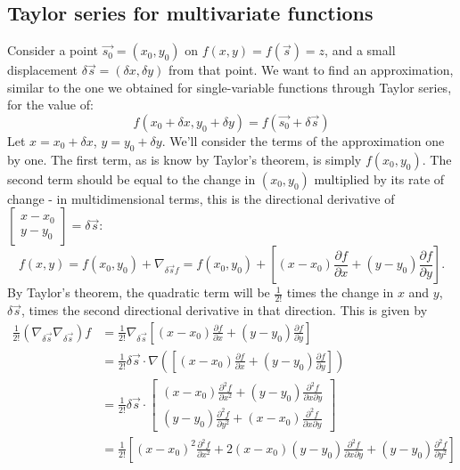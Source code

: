 \documentclass{article}
\begin{document}
\subsection{Taylor series for multivariate functions}
Consider a point $\vec{s_0}=(x_0,y_0)$ on $f(x,y)=f(\vec{s})=z$, and a small displacement $\delta \vec{s}=(\delta x, \delta y)$ from that point. We want to find an approximation, similar to the one we obtained for single-variable functions through Taylor series, for the value of:
\begin{equation*}
    f(x_0+\delta x, y_0+\delta y) = f(\vec{s_0}+\delta \vec{s})
\end{equation*}
Let $x = x_0 + \delta x$, $y=y_0 + \delta y$. We'll consider the terms of the approximation one by one. The first term, as is know by Taylor's theorem, is simply $f(x_0,y_0)$. The second term should be equal to the change in $(x_0,y_0)$ multiplied by its rate of change - in multidimensional terms, this is the directional derivative of $\begin{bmatrix}
    x-x_0\\y-y_0
\end{bmatrix}=\delta \vec{s}$:
\begin{equation*}
    f(x,y)=f(x_0,y_0)+\nabla_{\delta \vec{s} f} =f(x_0,y_0)+[(x-x_0)\frac{\partial f}{\partial x} + (y-y_0)\frac{\partial f}{\partial y}].
\end{equation*}
By Taylor's theorem, the quadratic term will be $\frac{1}{2!}$ times the change in $x$ and $y$, $\delta \vec{s}$, times the second directional derivative in that direction. This is given by 
\begin{equation*}
    \begin{aligned}
        \frac{1}{2!}(\nabla_{\delta \vec{s}}\nabla_{\delta \vec{s}})f &= \frac{1}{2!}\nabla_{\delta \vec{s}}[(x-x_0)\frac{\partial f}{\partial x} + (y-y_0)\frac{\partial f}{\partial y}] \\
        &= \frac{1}{2!}\delta \vec{s}\cdot \nabla([(x-x_0)\frac{\partial f}{\partial x} + (y-y_0)\frac{\partial f}{\partial y}])\\
        &= \frac{1}{2!}\delta \vec{s}\cdot\begin{bmatrix}
            (x-x_0)\frac{\partial^2 f}{\partial x^2} +(y-y_0)\frac{\partial^2 f}{\partial x \partial y}\\
            (y-y_0)\frac{\partial^2 f}{\partial y^2}+(x-x_0)\frac{\partial^2 f}{\partial x \partial y}
        \end{bmatrix} \\
        &= \frac{1}{2!}[(x-x_0)^2 \frac{\partial^2 f}{\partial x^2} + 2(x-x_0)(y-y_0)\frac{\partial^2 f}{\partial x \partial y}+(y-y_0)\frac{\partial^2 f}{\partial y^2}]
    \end{aligned}
\end{equation*}
\end{document}

